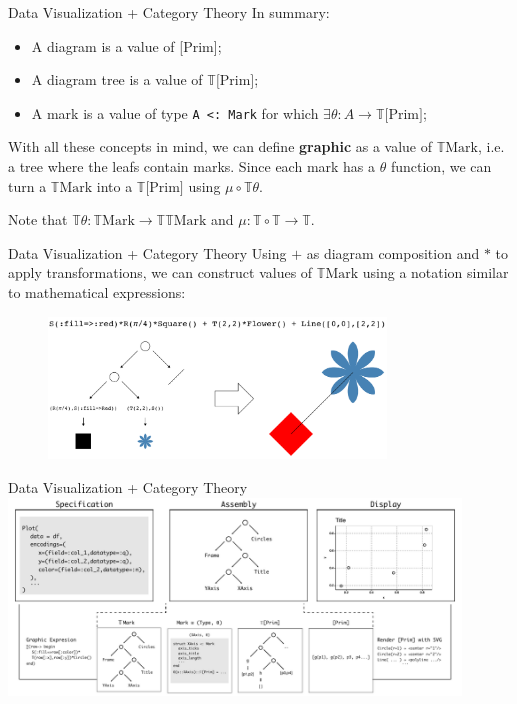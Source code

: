 \documentclass[aspectratio=169,xcolor=dvipsnames,10pt]{beamer}
\theoremstyle{definition}
\begin{document}
\begin{frame}[fragile]{Data Visualization + Category Theory}
  In summary:
  \begin{itemize}
      \item A diagram is a value of [Prim];
      \item A diagram tree is a value of $\mathbb T \text{[Prim]}$;
      \item A mark is a value of type \texttt{A <: Mark} for which $\exists \theta:A \to \mathbb T\text{[Prim]}$;
  \end{itemize}

  \vspace{3mm}
   
   With all these concepts in mind, we can define \textbf{graphic} as a value of $\mathbb T \text{Mark}$,
  i.e. a tree where the leafs contain marks. Since each mark has a $\theta$ function,
  we can turn a $\mathbb T\text{Mark}$ into a $\mathbb T \text{[Prim]}$ using $\mu \circ \mathbb T \theta$.

  \vspace{3mm}

  Note that $\mathbb T \theta: \mathbb T\text{Mark} \to \mathbb T \mathbb T \text{Mark}$ and
  $\mu:\mathbb T \circ \mathbb T \to \mathbb T$.
\end{frame}


\begin{frame}[fragile]{Data Visualization + Category Theory}
  Using $+$ as diagram composition and $*$ to apply transformations,
  we can construct values of $\mathbb T\text{Mark}$ using a notation similar to
  mathematical expressions:
  \begin{figure}
    \begin{center}
        \includegraphics[width=0.8\textwidth]{./figs/graphic.pdf}
    \end{center}
  \end{figure}
\end{frame}

\begin{frame}[fragile]{Data Visualization + Category Theory}
    \centering
    \includegraphics[width=0.9\textwidth]{figs/pipe.pdf}
\end{frame}
\end{document}
